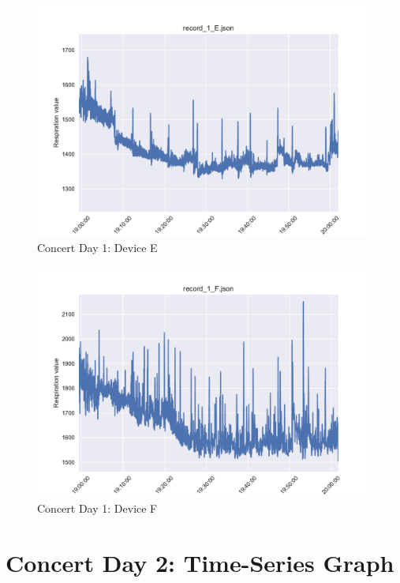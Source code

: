 \begin{figure}
    \centering
    \includegraphics[scale=0.6]{images/record_1_e.pdf}
    \caption{Concert Day 1: Device E}
    \label{fig:concert_day1_e}
\end{figure}

\begin{figure}
    \centering
    \includegraphics[scale=0.6]{images/record_1_f.pdf}
    \caption{Concert Day 1: Device F}
    \label{fig:concert_day1_f}
\end{figure}

\section{Concert Day 2: Time-Series Graph}


